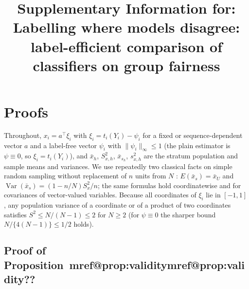 \documentclass[pdflatex,sn-mathphys-num,iicol]{sn-jnl}
\makeatletter
\theoremstyle{thmstyleone}
\theoremstyle{thmstyletwo}
\theoremstyle{thmstylethree}
\newcommand{\Mref}[1]{\ifcsname mref@#1\endcsname\csname mref@#1\endcsname\else\textbf{??}\fi}
\makeatother
\begin{document}
\title[Supplementary Information]{Supplementary Information for: Labelling where models disagree: label-efficient comparison of classifiers on group fairness}
\author*[1]{ }
\maketitle
\section{Proofs}\label{si:proofs}\label{sec:theory-proofs}

Throughout, $x_i=a^\top\xi_i$ with $\xi_i=t_i(Y_i)-\psi_i$ for a fixed or sequence-dependent vector $a$ and a
label-free vector $\psi_i$ with $\|\psi_i\|_\infty\le1$ (the plain estimator is $\psi\equiv0$, so $\xi_i=t_i(Y_i)$), and
$\bar x_h$, $S^2_{x,h}$, $\bar x_{s_h}$, $s^2_{x,h}$ are the stratum population and sample means
and variances. We use repeatedly two classical facts on simple random sampling without
replacement of $n$ units from $N$ \citep[Ch.~2]{cochran1977}: $E(\bar x_s)=\bar x_U$ and
$\operatorname{Var}(\bar x_s)=(1-n/N)S^2_x/n$; the same formulas hold coordinatewise and for
covariances of vector-valued variables. Because all coordinates of $\xi_i$ lie in $[-1,1]$, any population
variance of a coordinate or of a product of two coordinates satisfies
$S^2\le N/(N-1)\le2$ for $N\ge2$ (for $\psi\equiv0$ the sharper bound $N/\{4(N-1)\}\le1/2$ holds).

\subsection{Proof of Proposition~\Mref{prop:validity}}
\end{document}
